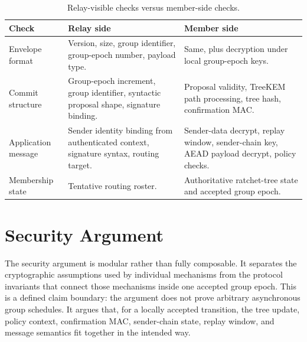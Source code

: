 \documentclass[preprint,12pt]{elsarticle}
\theoremstyle{definition}
\begin{document}
\begin{table}[tbp]
\centering
\caption{Relay-visible checks versus member-side checks.}\label{tab:relay}
\small
\begin{tabularx}{\textwidth}{@{}p{}YY@{}}
\toprule
Check & Relay side & Member side \\
\midrule
Envelope format & Version, size, group identifier, group-epoch number, payload type. & Same, plus decryption under local group-epoch keys. \\
Commit structure & Group-epoch increment, group identifier, syntactic proposal shape, signature binding. & Proposal validity, TreeKEM path processing, tree hash, confirmation MAC. \\
Application message & Sender identity binding from authenticated context, signature syntax, routing target. & Sender-data decrypt, replay window, sender-chain key, AEAD payload decrypt, policy checks. \\
Membership state & Tentative routing roster. & Authoritative ratchet-tree state and accepted group epoch. \\
\bottomrule
\end{tabularx}
\end{table}

\section{Security Argument}\label{sec:security}

The security argument is modular rather than fully composable. It separates
the cryptographic assumptions used by individual mechanisms from the protocol
invariants that connect those mechanisms inside one accepted group epoch. This is a
defined claim boundary: the argument does not prove arbitrary asynchronous
group schedules. It argues that, for a locally accepted transition, the tree
update, policy context, confirmation MAC, sender-chain state, replay window,
and message semantics fit together in the intended way.
\end{document}

